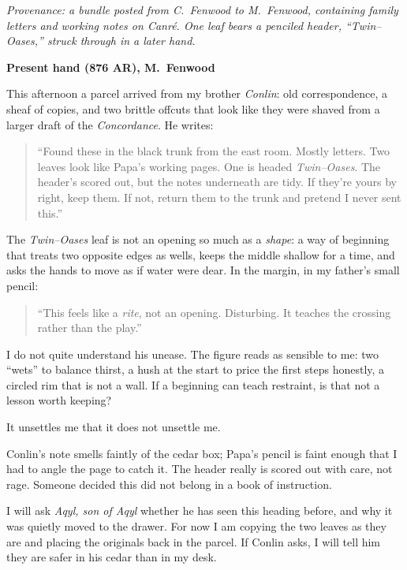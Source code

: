 \documentclass[11pt]{article}
\begin{document}
\noindent\textit{Provenance: a bundle posted from C.\ Fenwood to M.\ Fenwood, containing family letters and working notes on \emph{Canr\'e}. One leaf bears a penciled header, ``Twin--Oases,'' struck through in a later hand.}

\medskip
\noindent\textbf{Present hand (876 AR), M.\ Fenwood}

This afternoon a parcel arrived from my brother \textit{Conlin}: old correspondence, a sheaf of copies, and two brittle offcuts that look like they were shaved from a larger draft of the \emph{Concordance}. He writes:

\begin{quote}\small
``Found these in the black trunk from the east room. Mostly letters. Two leaves look like Papa’s working pages. One is headed \emph{Twin--Oases}. The header’s scored out, but the notes underneath are tidy. If they’re yours by right, keep them. If not, return them to the trunk and pretend I never sent this.''
\end{quote}

The \emph{Twin--Oases} leaf is not an opening so much as a \emph{shape}: a way of beginning that treats two opposite edges as wells, keeps the middle shallow for a time, and asks the hands to move as if water were dear. In the margin, in my father’s small pencil:

\begin{quote}\small
``This feels like a \emph{rite}, not an opening. Disturbing. It teaches the crossing rather than the play.''
\end{quote}

I do not quite understand his unease. The figure reads as sensible to me: two “wets” to balance thirst, a hush at the start to price the first steps honestly, a circled rim that is not a wall. If a beginning can teach restraint, is that not a lesson worth keeping?

It unsettles me that it does not unsettle me.

Conlin’s note smells faintly of the cedar box; Papa’s pencil is faint enough that I had to angle the page to catch it. The header really is scored out with care, not rage. Someone decided this did not belong in a book of instruction.

I will ask \textit{Aqyl, son of Aqyl} whether he has seen this heading before, and why it was quietly moved to the drawer. For now I am copying the two leaves as they are and placing the originals back in the parcel. If Conlin asks, I will tell him they are safer in his cedar than in my desk.
\end{document}
